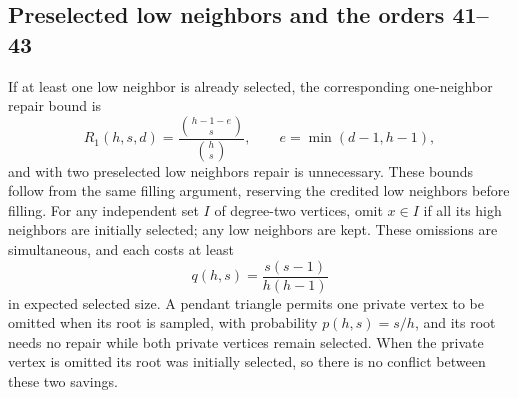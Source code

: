 \documentclass[11pt,a4paper]{article}
\theoremstyle{definition}\newtheorem{definition}[theorem]{Definition}
\theoremstyle{remark}\newtheorem{remark}[theorem]{Remark}
\begin{document}
\subsection{Preselected low neighbors and the orders 41--43}
\label{paired:boundary-section}

If at least one low neighbor is already selected, the corresponding
one-neighbor repair bound is
\begin{equation}\label{paired:R1}
 R_1(h,s,d)=\frac{\binom{h-1-e}{s}}{\binom hs},
 \qquad e=\min(d-1,h-1),
\end{equation}
and with two preselected low neighbors repair is unnecessary. These
bounds follow from the same filling argument, reserving the credited
low neighbors before filling. For any independent set $I$ of degree-two
vertices, omit $x\in I$ if all its high neighbors are initially selected;
any low neighbors are kept. These omissions are simultaneous, and
each costs at least
\begin{equation}\label{paired:low-credit}
 q(h,s)=\frac{s(s-1)}{h(h-1)}
\end{equation}
in expected selected size. A pendant triangle permits one private
vertex to be omitted when its root is sampled, with probability
$p(h,s)=s/h$, and its root needs no repair while both private
vertices remain selected. When the private vertex is omitted its
root was initially selected, so there is no conflict between these
two savings.
\end{document}
